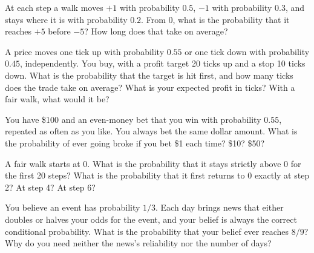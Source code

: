 \begin{question}\label{iq:iv1:random-walks-and-martingales:10}
At each step a walk moves $+1$ with probability $0.5$, $-1$ with probability $0.3$, and stays where it is with probability $0.2$. From 0, what is the probability that it reaches $+5$ before $-5$? How long does that take on average?
\end{question}

\begin{question}\label{iq:iv1:random-walks-and-martingales:11}
A price moves one tick up with probability $0.55$ or one tick down with probability $0.45$, independently. You buy, with a profit target 20 ticks up and a stop 10 ticks down. What is the probability that the target is hit first, and how many ticks does the trade take on average? What is your expected profit in ticks? With a fair walk, what would it be?
\end{question}

\begin{question}\label{iq:iv1:random-walks-and-martingales:12}
You have \$100 and an even-money bet that you win with probability $0.55$, repeated as often as you like. You always bet the same dollar amount. What is the probability of ever going broke if you bet \$1 each time? \$10? \$50?
\end{question}

\begin{question}\label{iq:iv1:random-walks-and-martingales:13}
A fair walk starts at 0. What is the probability that it stays strictly above 0 for the first 20 steps? What is the probability that it first returns to 0 exactly at step 2? At step 4? At step 6?
\end{question}

\begin{question}\label{iq:iv1:random-walks-and-martingales:14}
You believe an event has probability $1/3$. Each day brings news that either doubles or halves your odds for the event, and your belief is always the correct conditional probability. What is the probability that your belief ever reaches $8/9$? Why do you need neither the news's reliability nor the number of days?
\end{question}

